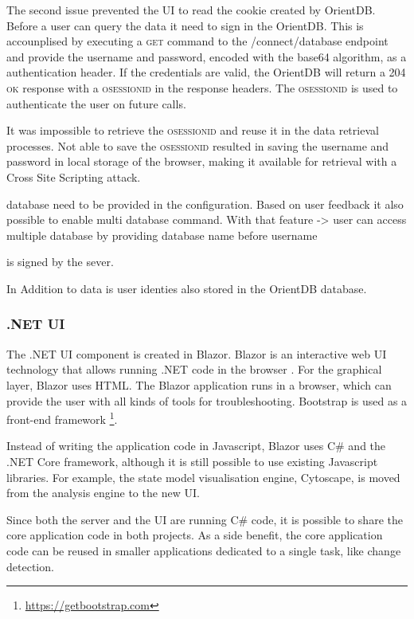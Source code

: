 The second issue prevented the UI to read the cookie created by OrientDB. Before a user can query the data it need to sign in the OrientDB. This is accounplised by executing a \textsc{get} command to the /connect/database endpoint and provide the username and password, encoded with the base64 algorithm, as a authentication header. If the credentials are valid, the OrientDB will return a \textsc{204 ok} response with a \textsc{osessionid} in the response headers. The \textsc{osessionid} is used to authenticate the user on future calls.

It was impossible to retrieve the \textsc{osessionid} and reuse it in the data retrieval processes. Not able to save the \textsc{osessionid} resulted in saving the username and password in local storage of the browser, making it available for retrieval with a Cross Site Scripting attack. 

database need to be provided in the configuration. Based on user feedback it also possible to enable multi database command. With that feature -> user can access multiple database by providing database name before username 

is signed by the sever. 

In Addition to data is user identies also stored in the OrientDB database. 

\subsubsection{.NET UI}
The .NET UI component is created in Blazor. Blazor is an interactive web UI technology that allows running .NET code in the browser \cite{what-is-blazor}. For the graphical layer, Blazor uses HTML. The Blazor application runs in a browser, which can provide the user with all kinds of tools for troubleshooting. Bootstrap is used as a front-end framework \footnote{\url{https://getbootstrap.com}}.

Instead of writing the application code in Javascript, Blazor uses C\# and the .NET Core framework, although it is still possible to use existing Javascript libraries. For example, the state model visualisation engine, Cytoscape, is moved from the \testar analysis engine to the new \testarnet UI.

Since both the server and the UI are running C\# code, it is possible to share the core application code in both projects. As a side benefit, the core application code can be reused in smaller applications dedicated to a single task, like change detection. 


